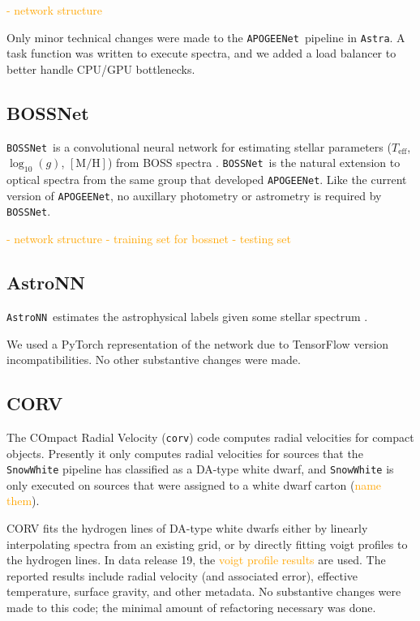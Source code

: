 \documentclass[modern]{aastex631}
\newcommand{\astra}{\texttt{Astra}}
\newcommand{\Astra}{\astra}
\newcommand{\pipeline}[1]{\texttt{#1}}
\newcommand{\APOGEENet}{\pipeline{APOGEENet}}
\newcommand{\BOSSNet}{\pipeline{BOSSNet}}
\newcommand{\todo}[1]{\textcolor{orange}{#1}}
\newcommand{\teff}{T_\mathrm{eff}}
\newcommand{\logg}{\log_{10}(g)}
\newcommand{\mh}{[\mathrm{M/H}]}
\begin{document}
\todo{- network structure}

Only minor technical changes were made to the \APOGEENet\ pipeline in \Astra. A task function was written to execute spectra, and we added a load balancer to better handle CPU/GPU bottlenecks.

\subsection{BOSSNet} \label{sec:methods-boss-net}

\BOSSNet\ is a convolutional neural network for estimating stellar parameters ($\teff$, $\logg$, $\mh$) from BOSS spectra \citep{bossnet}. \BOSSNet\ is the natural extension to optical spectra from the same group that developed \APOGEENet. Like the current version of \APOGEENet, no auxillary photometry or astrometry is required by \BOSSNet.

\todo{
- network structure
- training set for bossnet
- testing set
}

\subsection{AstroNN} \label{sec:methods-astro-nn}

\newcommand{\astronn}{\texttt{AstroNN}}

\astronn\ estimates the astrophysical labels given some stellar spectrum \citep{leung}.


We used a PyTorch representation of the network due to TensorFlow version incompatibilities. No other substantive changes were made. 


\subsection{CORV} \label{sec:methods-corv}

The COmpact Radial Velocity (\texttt{corv}) code computes radial velocities for compact objects. Presently it only computes radial velocities for sources that the \texttt{SnowWhite} pipeline has classified as a DA-type white dwarf, and \texttt{SnowWhite} is only executed on sources that were assigned to a white dwarf carton (\todo{name them}).

CORV fits the hydrogen lines of DA-type white dwarfs either by linearly interpolating spectra from an existing grid, or by directly fitting voigt profiles to the hydrogen lines. In data release 19, the \todo{voigt profile results} are used. The reported results include radial velocity (and associated error), effective temperature, surface gravity, and other metadata. No substantive changes were made to this code; the minimal amount of refactoring necessary was done.
\end{document}
